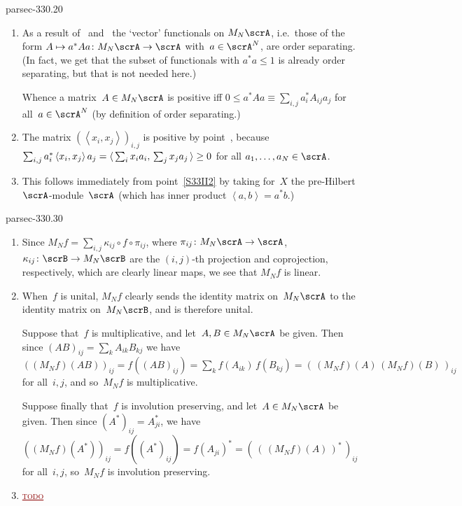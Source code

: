 \documentclass[b5page]{book}
\newcommand{\TODO}[1]{\textcolor{darkred}{\textsc{\underline{todo}}}}
\begin{document}
\begin{solution}{parsec-330.20}%
\begin{enumerate}
\item
\label{S33II1}
As a result of~
and~
the `vector' functionals on $M_N\scrA$,
i.e.~those of the form $A\mapsto a^* A a \colon M_N\scrA\to \scrA$
with~$a\in \scrA^N$,
are order separating.
(In fact, we get
that the subset of functionals with $a^*a\leq 1$ is already
order separating, but that is not needed here.)

Whence a matrix~$A\in M_N\scrA$ is positive
iff $0\leq a^* A a\equiv \sum_{i,j} a_i^* A_{ij} a_j$
for all~$a\in \scrA^N$
(by definition of order separating.)

\item
\label{S33II2}
The matrix $(\left<x_i,x_j\right>)_{i,j}$ is positive
by point~,
because $\sum_{i,j} a_i^* \left<x_i,x_j\right>a_j
=  \left<\,\smash{\sum_ix_i a_i,\,\sum_jx_j a_j\,}\right>\geq 0$
for all $a_1,\dotsc,a_N\in\scrA$.

\item
This follows immediately from point~\ref{S33II2}
by taking for~$X$ the pre-Hilbert $\scrA$-module~$\scrA$
(which has inner product $\left<a,b\right>=a^*b$.)
\end{enumerate}
\end{solution}
\begin{solution}{parsec-330.30}%
\begin{enumerate}
\item 
Since  $M_Nf = \sum_{i,j} \kappa_{ij}\circ f\circ \pi_{ij}$,
where  $\pi_{ij}\colon M_N\scrA\to \scrA$, 
$\kappa_{ij}\colon \scrB\to M_N\scrB$
are the $(i,j)$-th projection and coprojection, respectively,
which are clearly linear maps,
we see 
that $M_Nf$ is linear.
\item
When~$f$ is unital, $M_Nf$ clearly sends the identity matrix 
on~$M_N\scrA$ to the identity matrix on~$M_N\scrB$,
and is therefore unital.

Suppose that~$f$ is multiplicative,
and let~$A,B\in M_N\scrA$ be given.
Then since $(AB)_{ij} = \sum_k A_{ik} B_{kj}$
we have $((M_Nf)(AB))_{ij}
= f((AB)_{ij})
= \sum_k f(A_{ik})\,f(B_{kj})
= (\,(M_Nf)(A)\,(M_Nf)(B)\,)_{ij}$ for all~$i,j$,
and so~$M_Nf$ is multiplicative.

Suppose finally that~$f$ is involution preserving,
and let~$A\in M_N\scrA$ be given.
Then since $(A^*)_{ij}=A_{ji}^*$,
we have
$((M_Nf)(A^*))_{ij}
= f((A^*)_{ij})
= f(A_{ji})^*
= (\,(\,(M_Nf)(A)\,)^*\,)_{ij}$
for all~$i,j$,
so~$M_N f$ is involution preserving.
\item

\TODO{}


\end{enumerate}
\end{solution}
\end{document}
